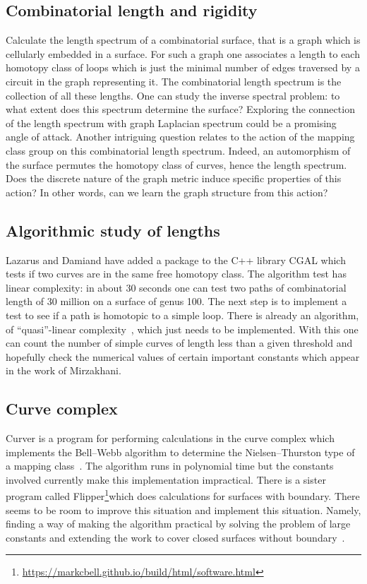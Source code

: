 \documentclass[14pt,fleqn]{article}
\begin{document}
\subsection{Combinatorial length and rigidity}
 Calculate the length
spectrum of a combinatorial surface, that is a graph which is
cellularly embedded in a surface.  For such a graph one associates a
length to each homotopy class of loops which is just the minimal
number of edges traversed by a circuit in the graph representing
it. The combinatorial length spectrum is the collection of all these
lengths. One can study the inverse spectral problem: to what extent
does this spectrum determine the surface? Exploring the connection of the length spectrum with graph Laplacian spectrum could be a promising angle of attack. Another intriguing question relates to the action of the mapping class group on this combinatorial length spectrum. Indeed, an automorphism of the
 surface permutes the homotopy class of curves, hence the length spectrum. Does the discrete nature of the graph metric induce specific properties of this action? In other words, can we learn the graph structure from this action?

\subsection{Algorithmic study of lengths}

Lazarus and Damiand have
added a package to the C++ library  CGAL which tests if two curves are
in the same free homotopy class. The algorithm test has linear
complexity: in about 30 seconds one can test two paths of
combinatorial length of 30 million on a surface of genus
100. The next step is to implement a test to see if a path
is homotopic to a simple loop. There is already an algorithm, of
“quasi”-linear complexity~\cite{dl-cginc-19}, which just needs to be implemented. With
this one can count the number of simple curves of length less than a given threshold 
and hopefully check the numerical values of certain important constants which
appear in the work of Mirzakhani.


\subsection{Curve complex}

Curver is a program for
performing calculations in the curve complex which implements the
Bell–Webb algorithm to determine the Nielsen–Thurston type of a
mapping class~\cite{b-c-17,b-esmt-19}. The algorithm runs in polynomial time but the constants
involved currently make this implementation impractical. There is a
sister program called Flipper\footnote{\url{https://markcbell.github.io/build/html/software.html}}which does calculations for surfaces
with boundary. There seems to be room to improve this situation and
implement this situation. Namely, finding a way of making the
algorithm practical by solving the problem of large constants and
extending the work to cover closed surfaces without boundary~\cite{mm-sosr-19}.
\end{document}
